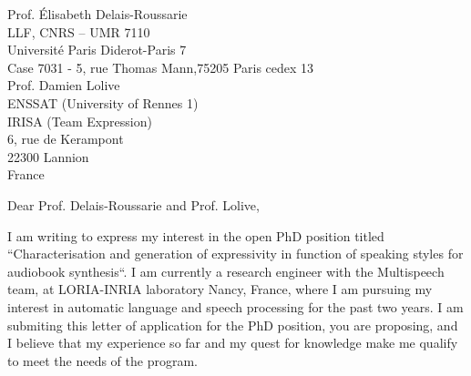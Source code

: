 \documentclass[
	pagenumber=false, %
	parskip=half, %
	fromalign=right, %
	foldmarks=false, %
	addrfield=false %
	]{scrlttr2}
\date{\today} %
\begin{document}
 
\begin{letter}{Prof. Élisabeth Delais\--Roussarie \\ LLF, CNRS – UMR 7110\\ Université Paris Diderot-Paris 7\\
Case 7031 \-- 5, rue Thomas Mann,75205 Paris cedex 13\\ Prof. Damien Lolive\\ ENSSAT (University of Rennes 1)\\ IRISA (Team Expression) \\
6, rue de Kerampont\\
22300 Lannion\\
France\\} %



\opening{Dear Prof. Delais\--Roussarie and Prof. Lolive,}

I am writing to express my interest in the open PhD position titled ``Characterisation  and  generation  of  expressivity  in  function  of  speaking  styles  for  audiobook 
synthesis``. I am currently a research engineer with the Multispeech team, at LORIA-INRIA laboratory Nancy, France, where I am pursuing my interest in automatic language and speech processing for the past two years. I am submiting this letter of application for the PhD position, you are proposing, and I believe that my experience so far and my quest for knowledge make me qualify to meet the needs of the program. 
		

\end{letter}
\end{document}

